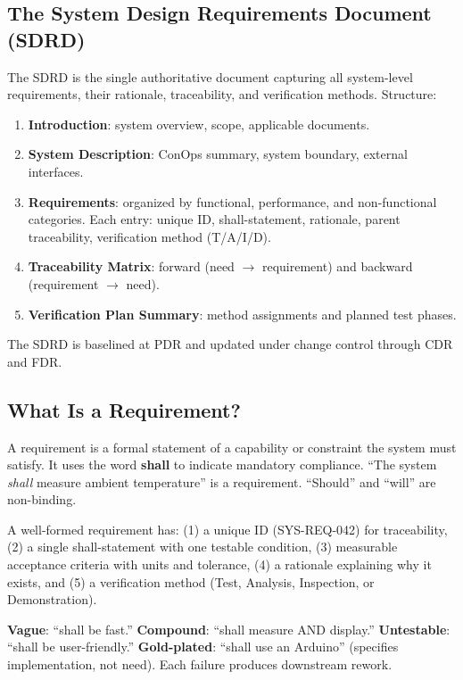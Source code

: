 \documentclass[11pt,letterpaper,twoside,openany]{book}
\begin{document}
\subsection{The System Design Requirements Document (SDRD)}
The SDRD is the single authoritative document capturing all system-level requirements, their rationale, traceability, and verification methods. Structure:
\begin{enumerate}[nosep,leftmargin=1.5em]
\item \textbf{Introduction}: system overview, scope, applicable documents.
\item \textbf{System Description}: ConOps summary, system boundary, external interfaces.
\item \textbf{Requirements}: organized by functional, performance, and non-functional categories. Each entry: unique ID, shall-statement, rationale, parent traceability, verification method (T/A/I/D).
\item \textbf{Traceability Matrix}: forward (need $\to$ requirement) and backward (requirement $\to$ need).
\item \textbf{Verification Plan Summary}: method assignments and planned test phases.
\end{enumerate}
The SDRD is baselined at PDR and updated under change control through CDR and FDR.

\subsection{What Is a Requirement?}
A requirement is a formal statement of a capability or constraint the system must satisfy. It uses the word \textbf{shall} to indicate mandatory compliance. ``The system \emph{shall} measure ambient temperature'' is a requirement. ``Should'' and ``will'' are non-binding.

A well-formed requirement has: (1) a unique ID (SYS-REQ-042) for traceability, (2) a single shall-statement with one testable condition, (3) measurable acceptance criteria with units and tolerance, (4) a rationale explaining why it exists, and (5) a verification method (Test, Analysis, Inspection, or Demonstration).

\begin{warningbox}
\textbf{Vague}: ``shall be fast.'' \textbf{Compound}: ``shall measure AND display.'' \textbf{Untestable}: ``shall be user-friendly.'' \textbf{Gold-plated}: ``shall use an Arduino'' (specifies implementation, not need). Each failure produces downstream rework.
\end{warningbox}
\end{document}
